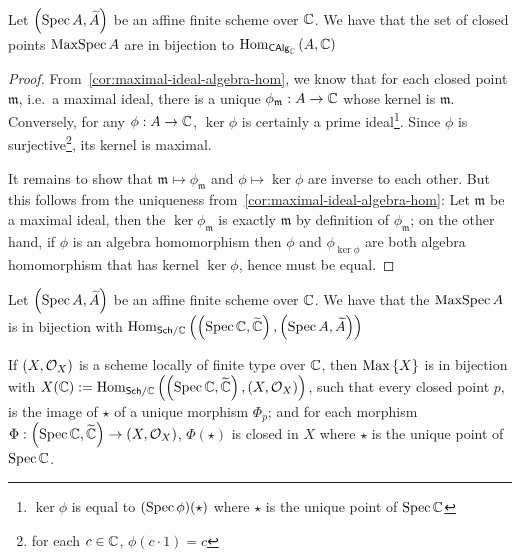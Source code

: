 \begin{proposition}\label{thm:affine-scheme-closed-points-biject-algebra-hom}
  Let $\left(\operatorname*{Spec}{A}, \widetilde{A}\right)$ be an affine finite scheme over $\mathbb{C}$. We have that the set of closed points $\operatorname{MaxSpec} A$ are in bijection to
  $\operatorname{Hom}_{\mathsf{CAlg}_{\mathbb{C}}}\left(A, \mathbb{C}\right)$
\end{proposition}

\begin{proof}
  From~\cref{cor:maximal-ideal-algebra-hom}, we know that for each closed point $\mathfrak m$, i.e.\ a maximal ideal, there is a unique $\phi_{\mathfrak m} : A \to \mathbb{C}$ whose kernel is $\mathfrak m$. Conversely, for any $\phi: A \to \mathbb{C}$, $\ker \phi$ is certainly a prime ideal\footnote{$\ker \phi$ is equal to $(\operatorname{Spec} \phi)(\star)$ where $\star$ is the unique point of $\operatorname{Spec}\mathbb{C}$}. Since $\phi$ is surjective\footnote{for each $c \in \mathbb{C}$, $\phi(c \cdot 1) = c$}, its kernel is maximal.


  It remains to show that $\mathfrak m \mapsto \phi_{\mathfrak{m}}$ and $\phi \mapsto \ker \phi$ are inverse to each other. But this follows from the uniqueness from~\cref{cor:maximal-ideal-algebra-hom}:
  Let $\mathfrak{m}$ be a maximal ideal, then the $\ker \phi_{\mathfrak{m}}$ is exactly $\mathfrak m$ by definition of $\phi_{\mathfrak m}$;
  on the other hand, if $\phi$ is an algebra homomorphism then $\phi$ and $\phi_{\ker \phi}$ are both algebra homomorphism that has kernel $\ker \phi$, hence must be equal.
\end{proof}

\begin{corollary}\label{cor:affine-closed-point-bijection-scheme-morphism}
  Let $\left(\operatorname*{Spec}{A}, \widetilde{A}\right)$ be an affine finite scheme over $\mathbb{C}$. We have that the $\operatorname{MaxSpec} A$ is in bijection with $\operatorname{Hom}_{\mathsf{Sch}/\mathbb{C}}\left(\left(\operatorname*{Spec}{\mathbb{C}}, \widetilde{\mathbb{C}}\right), \left(\operatorname*{Spec}{A}, \widetilde{A}\right)\right)$
\end{corollary}

\begin{proposition}
  If $\left(X, \mathcal{O}_{X}\right)$ is a scheme locally of finite type over $\mathbb{C}$, then $\operatorname{Max}\left\{X\right\}$ is in bijection with $X(\mathbb{C}) := \operatorname{Hom}_{\mathsf{Sch}/\mathbb{C}}\left(\left(\operatorname*{Spec}{\mathbb{C}}, \widetilde{\mathbb{C}}\right), \left(X, \mathcal{O}_{X}\right)\right)$,
  such that every closed point $p$, is the image of $\star$ of a unique morphism $\Phi_{p}$; and for each morphism $\Phi : \left(\operatorname*{Spec}{\mathbb{C}}, \widetilde{\mathbb{C}}\right)\to\left(X, \mathcal{O}_{X}\right)$, $\Phi(\star)$ is closed in $X$ where $\star$ is the unique point of $\operatorname{Spec}\mathbb{C}$.
\end{proposition}

